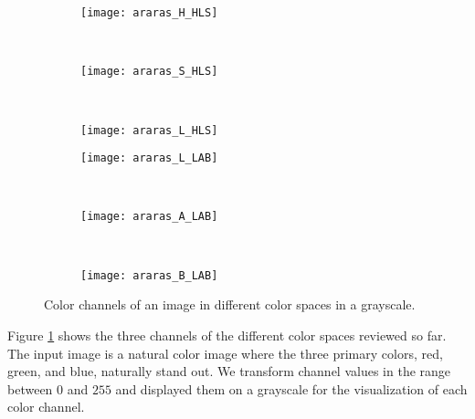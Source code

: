 \begin{figure}[!ht]
    \begin{subfigure}[t]{\textwidth+20pt\relax}
    	\texttt{[image: araras\_H\_HLS]}
    \end{subfigure}     
    ~ %
    \begin{subfigure}[b]{0.3\textwidth}
        \texttt{[image: araras\_S\_HLS]}
    \end{subfigure}
    ~ %
    \begin{subfigure}[b]{0.3\textwidth}
        \texttt{[image: araras\_L\_HLS]}
    \end{subfigure} \vspace{5pt} 
        
    \begin{subfigure}[t]{\textwidth+20pt\relax}
    	\texttt{[image: araras\_L\_LAB]}
    \end{subfigure}    
    ~ %
    \begin{subfigure}[b]{0.3\textwidth}
        \texttt{[image: araras\_A\_LAB]}
    \end{subfigure}
    ~ %
    \begin{subfigure}[b]{0.3\textwidth}
        \texttt{[image: araras\_B\_LAB]}
    \end{subfigure} 

	\caption{Color channels of an image in different color spaces in a grayscale.}\label{fig:images_color_space}    
\end{figure}


Figure \ref{fig:images_color_space} shows the three channels of the different color spaces reviewed so far. The input image is a natural color image where the three primary colors, red, green, and blue, naturally stand out. We transform channel values in the range between $0$ and $255$ and displayed them on a grayscale for the visualization of each color channel. 


